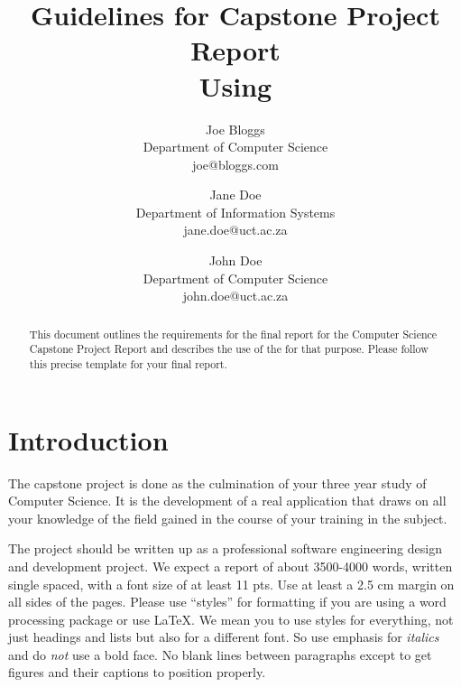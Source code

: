 \documentclass[11pt,a4paper]{article}
\begin{document}
\title{Guidelines for Capstone Project Report\\Using \LaTeXe} \date{}
\author{Joe Bloggs\\Department of Computer Science\\joe@bloggs.com
\and Jane Doe\\Department of Information Systems\\jane.doe@uct.ac.za
\and John Doe\\Department of Computer Science\\john.doe@uct.ac.za}

\chead{}
\lfoot{}
\cfoot{\thepage}    %
\rfoot{}
\renewcommand{\headrulewidth}{0.0pt}   %

\maketitle
\thispagestyle{plain}  %

\begin{abstract}
  This document outlines the requirements for the final report for the
  Computer Science Capstone Project Report and describes the use of
  the \LaTeXe for that purpose. Please follow this precise template
  for your final report.
\end{abstract}

\section{Introduction}
The capstone project is done as the culmination of your three year
study of Computer Science. It is the development of a real application
that draws on all your knowledge of the field gained in the course of
your training in the subject.

The project should be written up as a professional software
engineering design and development project. We expect a report of
about 3500-4000 words, written single spaced, with a font size of at
least 11 pts. Use at least a 2.5 cm margin on all sides of the
pages. Please use ``styles'' for formatting if you are using a word
processing package or use \LaTeX. We mean you to use styles for
everything, not just headings and lists but also for a different
font. So use emphasis for \emph{italics} and do \emph{not} use a bold
face. No blank lines between paragraphs except to get figures and
their captions to position properly.
\end{document}
